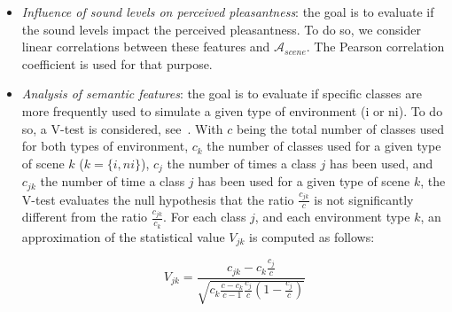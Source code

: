 \documentclass[12pt]{elsarticle}
\begin{document}
\begin{itemize}
\item \emph{Influence of sound levels on perceived pleasantness}: the goal is to evaluate if the sound levels impact the perceived pleasantness. To do so, we consider linear correlations between these features and $\mathcal{A}_{scene}$. The Pearson correlation coefficient is used for that purpose.



\item \emph{Analysis of semantic features}: the goal is to evaluate if specific classes are more frequently used to simulate a given type of environment (i or ni). To do so, a V-test is considered, see~\citep{rakotomalala2008tvpercent}. With $c$ being the total number of classes used for both types of environment, $c_k$ the number of classes used for a given type of scene $k$ ($k=\lbrace i,ni\rbrace$), $c_j$ the number of times a class $j$ has been used, and $c_{jk}$ the number of time a class $j$ has been used for a given type of scene $k$, the V-test evaluates the null hypothesis that the ratio $\frac{c_{jk}}{c}$ is not significantly different from the ratio $\frac{c_{jk}}{c_k}$. For each class $j$, and each environment type $k$, an approximation of the statistical value $V_{jk}$ is computed as follows:

\begin{equation}
V_{jk}=\dfrac{c_{jk}-c_k\frac{c_j}{c}}{\sqrt{c_k\frac{c-c_k}{c-1}\frac{c_j}{c}(1-\frac{c_j}{c})}}
\end{equation}


\end{itemize}
\end{document}
